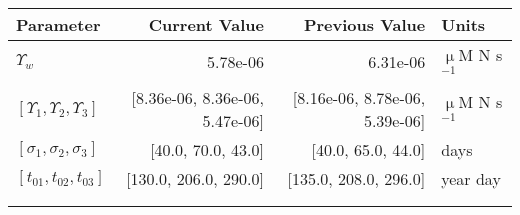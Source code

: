    \small
   \centering
   \begin{tabular}{lrrl}\toprule
    Parameter & Current Value & Previous Value & Units \\ \midrule
     $\Upsilon_{w} $ & 5.78e-06 & 6.31e-06 & $\upmu$M N s$^{-1}$ \\
     $[\Upsilon_{1},\Upsilon_{2},\Upsilon_{3}]$ & [8.36e-06, 8.36e-06, 5.47e-06] & [8.16e-06, 8.78e-06, 5.39e-06] & $\upmu$M N s$^{-1}$ \\
     $[\sigma _1,\sigma _2,\sigma _3]$ & [40.0, 70.0, 43.0] & [40.0, 65.0, 44.0] & days \\
     $[t_{01},t_{02},t_{03}]$ & [130.0, 206.0, 290.0] & [135.0, 208.0, 296.0] & year day \\
   \midrule
 \\ \\   \end{tabular}
